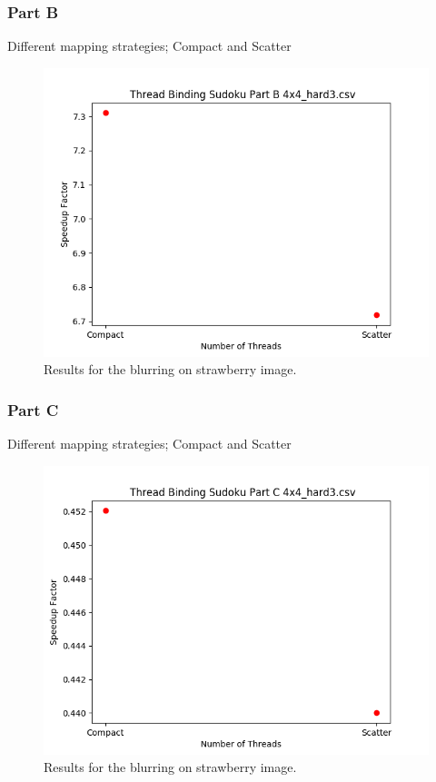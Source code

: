 \documentclass{article}
\begin{document}
\newpage

\subsubsection{Part B}
\begin{description}
    \item[Different mapping strategies; Compact and Scatter]
\end{description}
\begin{figure}[!htb]
    \centering
    \includegraphics[width=1\linewidth]{./img/binding_part_2_B.png}
    \caption{Results for the blurring on strawberry image.}
\end{figure}

\newpage

\subsubsection{Part C}
\begin{description}
    \item[Different mapping strategies; Compact and Scatter]
\end{description}
\begin{figure}[!htb]
    \centering
    \includegraphics[width=1\linewidth]{./img/binding_part_2_C.png}
    \caption{Results for the blurring on strawberry image.}
\end{figure}
\end{document}
